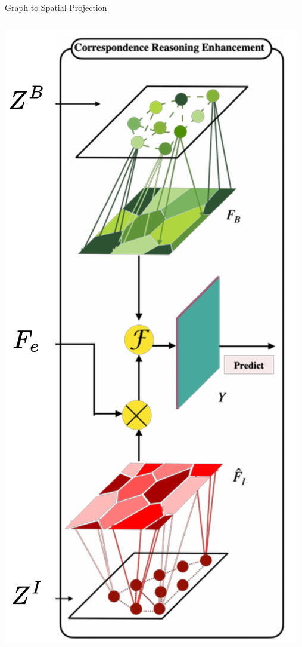 \documentclass[8pt,aspectratio=169,xcolor=dvipsnames]{beamer}
\begin{document}
\begin{frame}{Graph to Spatial Projection}
    \begin{columns}
        \begin{center}
        \includegraphics[width=\linewidth]{fusion.png} 
        \end{center}
        

\end{columns}
\end{frame}
\end{document}
